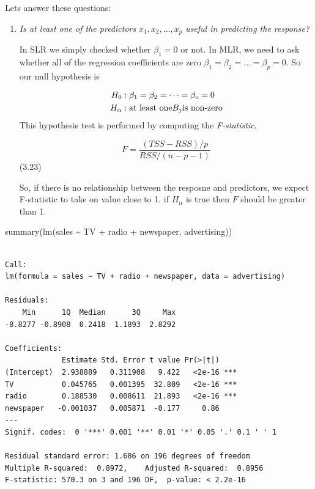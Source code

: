 \documentclass[
  letterpaper,
  DIV=11,
  numbers=noendperiod]{scrreprt}
\newenvironment{Shaded}{\begin{snugshade}}{\end{snugshade}}
\newcommand{\FunctionTok}[1]{\textcolor[rgb]{0.02,0.16,0.49}{#1}}
\newcommand{\NormalTok}[1]{\textcolor[rgb]{0.33,0.33,0.33}{#1}}
\newcommand{\SpecialCharTok}[1]{\textcolor[rgb]{0.00,0.46,0.62}{#1}}
\begin{document}
Lets answer these questions:

\begin{enumerate}
\def\labelenumi{\arabic{enumi}.}
\item
  \emph{Is at least one of the predictors} \(x_1, x_2, \dots, x_p\)
  \emph{useful in predicting the response?}

  In SLR we simply checked whether \(\beta_1 = 0\) or not. In MLR, we
  need to ask whether all of the regression coefficients are zero
  \(\beta_1 = \beta_2 = \dots = \beta_p = 0\). So our null hypothesis is

  \[
   \begin{align}
   H_0 &: \beta_1 = \beta_2 = \dots = \beta_o = 0 \\
   H_\alpha &: \text{at least one} \space B_j \space \text{is non-zero}
   \end{align}
   \] This hypothesis test is performed by computing the
  \emph{F-statistic},

  \[
   F = \frac{(TSS - RSS)/p}{RSS/(n-p-1)}
   \] (3.23)

  So, if there is no relationship between the resposne and predictors,
  we expect F-statistic to take on value close to 1. if \(H_\alpha\) is
  true then \(F\) should be greater than 1.
\end{enumerate}

\begin{Shaded}
\begin{Highlighting}[]
\FunctionTok{summary}\NormalTok{(}\FunctionTok{lm}\NormalTok{(sales }\SpecialCharTok{\textasciitilde{}}\NormalTok{ TV }\SpecialCharTok{+}\NormalTok{ radio }\SpecialCharTok{+}\NormalTok{ newspaper, advertising))}
\end{Highlighting}
\end{Shaded}

\begin{verbatim}

Call:
lm(formula = sales ~ TV + radio + newspaper, data = advertising)

Residuals:
    Min      1Q  Median      3Q     Max 
-8.8277 -0.8908  0.2418  1.1893  2.8292 

Coefficients:
             Estimate Std. Error t value Pr(>|t|)    
(Intercept)  2.938889   0.311908   9.422   <2e-16 ***
TV           0.045765   0.001395  32.809   <2e-16 ***
radio        0.188530   0.008611  21.893   <2e-16 ***
newspaper   -0.001037   0.005871  -0.177     0.86    
---
Signif. codes:  0 '***' 0.001 '**' 0.01 '*' 0.05 '.' 0.1 ' ' 1

Residual standard error: 1.686 on 196 degrees of freedom
Multiple R-squared:  0.8972,    Adjusted R-squared:  0.8956 
F-statistic: 570.3 on 3 and 196 DF,  p-value: < 2.2e-16
\end{verbatim}
\end{document}
